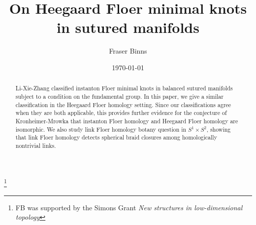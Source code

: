 \documentclass{amsart}
\theoremstyle{definition}
\theoremstyle{remark}
\numberwithin{equation}{section}
\begin{document}
\title{On Heegaard Floer minimal knots in sutured manifolds}

\author{Fraser Binns}
\address{Department of Mathematics, Princeton University}


\thanks{FB was supported by the Simons Grant {\em New structures in low-dimensional topology}}




\date{\today}




\begin{abstract}
  Li-Xie-Zhang classified instanton Floer minimal knots in balanced sutured manifolds subject to a condition on the fundamental group. In this paper, we give a similar classification in the Heegaard Floer homology setting. Since our classifications agree when they are both applicable, this provides further evidence for the conjecture of Kronheimer-Mrowka that instanton Floer homology and Heegaard Floer homology are isomorphic. We also study link Floer homology botany question in $S^1\times S^2$, showing that link Floer homology detects spherical braid closures among homologically nontrivial links.
\end{abstract}

\maketitle
\end{document}
